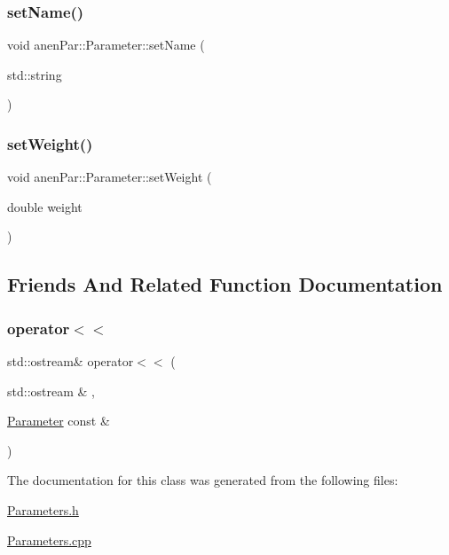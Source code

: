 \subsubsection{\texorpdfstring{set\+Name()}{setName()}}
{\footnotesize\ttfamily void anen\+Par\+::\+Parameter\+::set\+Name (\begin{DoxyParamCaption}\item[{std\+::string}]{ }\end{DoxyParamCaption})}

\mbox{\label{classanen_par_1_1_parameter_acee344040fad3068f321c5fdf6b29cfe}} 
\subsubsection{\texorpdfstring{set\+Weight()}{setWeight()}}
{\footnotesize\ttfamily void anen\+Par\+::\+Parameter\+::set\+Weight (\begin{DoxyParamCaption}\item[{double}]{weight }\end{DoxyParamCaption})}



\subsection{Friends And Related Function Documentation}
\mbox{\label{classanen_par_1_1_parameter_a062fa105b64c362071304bc5f2eb350a}} 
\subsubsection{\texorpdfstring{operator$<$$<$}{operator<<}}
{\footnotesize\ttfamily std\+::ostream\& operator$<$$<$ (\begin{DoxyParamCaption}\item[{std\+::ostream \&}]{,  }\item[{\mbox{\hyperlink{classanen_par_1_1_parameter}{Parameter}} const \&}]{ }\end{DoxyParamCaption})\hspace{0.3cm}{\ttfamily [friend]}}



The documentation for this class was generated from the following files\+:\begin{DoxyCompactItemize}
\item 
\mbox{\hyperlink{_parameters_8h}{Parameters.\+h}}\item 
\mbox{\hyperlink{_parameters_8cpp}{Parameters.\+cpp}}\end{DoxyCompactItemize}
